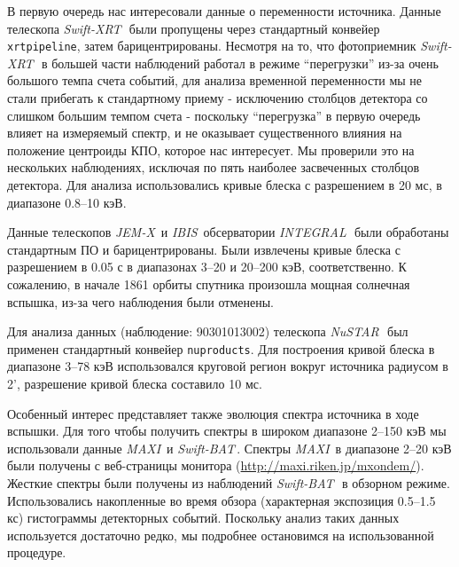 \documentclass{pazhb}
\def\maxi{{\em MAXI}}
\def\swiftx{{\em Swift-XRT\,}}
\def\swiftb{{\em Swift-BAT\,}}
\def\nustar{{\em NuSTAR\,}}
\def\integral{{\em INTEGRAL\,}}
\def\jemx{{\em JEM-X}}
\def\ibis{ {\em IBIS}}
\begin{document}
В первую очередь нас интересовали данные о переменности источника. Данные телескопа \swiftx\, были пропущены через стандартный конвейер \texttt{xrtpipeline}, затем барицентрированы. Несмотря на то, что фотоприемник \swiftx\, в большей части наблюдений работал в режиме ``перегрузки'' из-за очень большого темпа счета событий, для анализа временной переменности мы не стали прибегать к стандартному приему - исключению столбцов детектора со слишком большим темпом счета - поскольку ``перегрузка'' в первую очередь влияет на измеряемый спектр, и не оказывает существенного влияния на положение центроиды КПО, которое нас интересует. Мы проверили это на нескольких наблюдениях, исключая по пять наиболее засвеченных столбцов детектора. Для анализа использовались кривые блеска с разрешением в 20 мс, в диапазоне 0.8--10 кэВ.

Данные телескопов \jemx\, \citep{lund03} и \ibis\, \citep{ubertini03} обсерватории \integral\, были обработаны стандартным ПО и барицентрированы. Были извлечены кривые блеска с разрешением в 0.05 с в диапазонах 3--20 и 20--200 кэВ, соответственно. К сожалению, в начале 1861 орбиты спутника произошла мощная солнечная вспышка, из-за чего наблюдения были отменены.

Для анализа данных (наблюдение: 90301013002) телескопа \nustar\, был применен стандартный конвейер \texttt{nuproducts}. Для построения кривой блеска в диапазоне 3--78 кэВ использовался круговой регион вокруг источника радиусом в 2', разрешение кривой блеска составило 10 мс. 

Особенный интерес представляет также эволюция спектра источника в ходе вспышки. Для того чтобы получить спектры в широком диапазоне 2--150 кэВ мы использовали данные \maxi\, и \swiftb. Спектры \maxi\, в диапазоне 2--20 кэВ были получены с веб-страницы монитора (\url{http://maxi.riken.jp/mxondem/}). Жесткие спектры были получены из наблюдений \swiftb\, в обзорном режиме. Использовались накопленные во время обзора (характерная экспозиция 0.5--1.5 кс) гистограммы детекторных событий. Поскольку анализ таких данных используется достаточно редко, мы подробнее остановимся на использованной процедуре.
\end{document}
